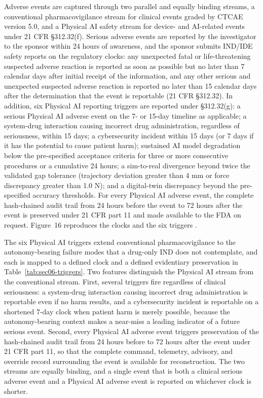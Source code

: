Adverse events are captured through two parallel and equally binding streams, a
conventional pharmacovigilance stream for clinical events graded by CTCAE version 5.0,
and a Physical AI safety stream for device- and AI-related events under 21 CFR
\S 312.32(f). Serious adverse events are reported by the investigator to the sponsor
within 24 hours of awareness, and the sponsor submits IND/IDE safety reports on the
regulatory clocks: any unexpected fatal or life-threatening suspected adverse
reaction is reported as soon as possible but no later than 7 calendar days after
initial receipt of the information, and any other serious and unexpected suspected
adverse reaction is reported no later than 15 calendar days after the determination
that the event is reportable (21 CFR \S 312.32). In addition, six Physical AI
reporting triggers are reported under \S 312.32(g): a serious Physical AI adverse
event on the 7- or 15-day timeline as applicable; a system-drug interaction causing
incorrect drug administration, regardless of seriousness, within 15 days; a
cybersecurity incident within 15 days (or 7 days if it has the potential to cause
patient harm); sustained AI model degradation below the pre-specified acceptance
criteria for three or more consecutive procedures or a cumulative 24 hours; a
sim-to-real divergence beyond twice the validated gap tolerance (trajectory deviation
greater than 4 mm or force discrepancy greater than 1.0 N); and a digital-twin
discrepancy beyond the pre-specified accuracy thresholds. For every Physical AI
adverse event, the complete hash-chained audit trail from 24 hours before the event
to 72 hours after the event is preserved under 21 CFR part 11 and made available to
the FDA on request. Figure~16 reproduces the clocks and the six triggers
\cite{phase1guidance,cfr312paiuni}.

The six Physical AI triggers extend conventional pharmacovigilance to the
autonomy-bearing failure modes that a drug-only IND does not contemplate, and each is
mapped to a defined clock and a defined evidentiary preservation in
Table~\ref{tab:sec06-triggers}. Two features distinguish the Physical AI stream from
the conventional stream. First, several triggers fire regardless of clinical
seriousness: a system-drug interaction causing incorrect drug administration is
reportable even if no harm results, and a cybersecurity incident is reportable on a
shortened 7-day clock when patient harm is merely possible, because the
autonomy-bearing context makes a near-miss a leading indicator of a future serious
event. Second, every Physical AI adverse event triggers preservation of the
hash-chained audit trail from 24 hours before to 72 hours after the event under 21
CFR part 11, so that the complete command, telemetry, advisory, and override record
surrounding the event is available for reconstruction. The two streams are equally
binding, and a single event that is both a clinical serious adverse event and a
Physical AI adverse event is reported on whichever clock is shorter.

